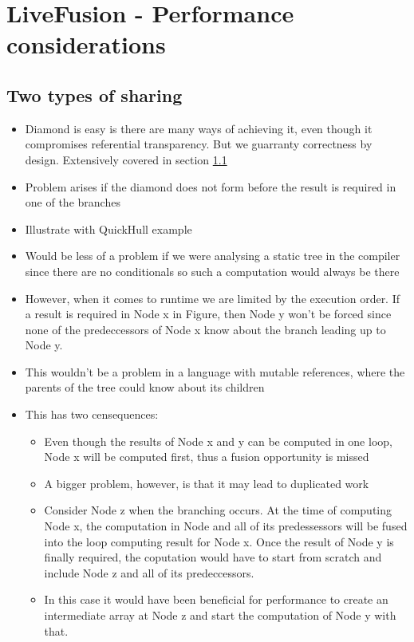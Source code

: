 \documentclass[preamble.tex]{subfiles}
\begin{document}
\pagebreak


\section{LiveFusion - Performance considerations}

\subsection{Two types of sharing}
\begin{itemize}
\item Diamond is easy is there are many ways of achieving it, even though it compromises referential transparency. But we guarranty correctness by design. Extensively covered in section \ref{}
\item Problem arises if the diamond does not form before the result is required in one of the branches
\item Illustrate with QuickHull example
\item Would be less of a problem if we were analysing a static tree in the compiler since there are no conditionals so such a computation would always be there
\item However, when it comes to runtime we are limited by the execution order. If a result is required in Node x in Figure, then Node y won't be forced since none of the predeccessors of Node x know about the branch leading up to Node y.
\item This wouldn't be a problem in a language with mutable references, where the parents of the tree could know about its children
\item This has two censequences:
\begin{itemize}
  \item Even though the results of Node x and y can be computed in one loop, Node x will be computed first, thus a fusion opportunity is missed
  \item A bigger problem, however, is that it may lead to duplicated work
  \item Consider Node z when the branching occurs. At the time of computing Node x, the computation in Node and all of its predessessors will be fused into the loop computing result for Node x. Once the result of Node y is finally required, the coputation would have to start from scratch and include Node z and all of its predeccessors.
  \item In this case it would have been beneficial for performance to create an intermediate array at Node z and start the computation of Node y with that.
\end{itemize}
\end{itemize}
\end{document}
